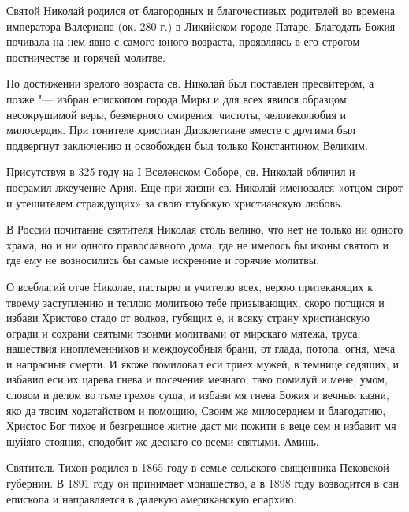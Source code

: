  

Святой Николай родился от благородных и благочестивых родителей во времена императора Валериана (ок. 280 г.) в Ликийском городе Патаре. Благодать Божия почивала на нем явно с самого юного возраста, проявляясь в его строгом постничестве и горячей молитве. 

По достижении зрелого возраста св. Николай был поставлен пресвитером, а позже "--- избран епископом города Миры и для всех явился образцом несокрушимой веры, безмерного смирения, чистоты, человеколюбия и милосердия. При гонителе христиан Диоклетиане вместе с другими был подвергнут заключению и освобожден был только Константином Великим. 

Присутствуя в 325 году на I Вселенском Соборе, св. Николай обличил и посрамил лжеучение Ария. Еще при жизни св. Николай именовался «отцом сирот и утешителем страждущих» за свою глубокую христианскую любовь. 

В России почитание святителя Николая столь велико, что нет не только ни одного храма, но и ни одного православного дома, где не имелось бы иконы святого и где ему не возносились бы самые искренние и горячие молитвы.




О всеблагий отче Николае, пастырю и учителю всех, верою притекающих к твоему заступлению и теплою молитвою тебе призывающих, скоро потщися и избави Христово стадо от волков, губящих е, и всяку страну христианскую огради и сохрани святыми твоими молитвами от мирскаго мятежа, труса, нашествия иноплеменников и междоусобныя брани, от глада, потопа, огня, меча и напрасныя смерти. И якоже помиловал еси триех мужей, в темнице седящих, и избавил еси их царева гнева и посечения мечнаго, тако помилуй и мене, умом, словом и делом во тьме грехов суща, и избави мя гнева Божия и вечныя казни, яко да твоим ходатайством и помощию, Своим же милосердием и благодатию, Христос Бог тихое и безгрешное житие даст ми пожити в веце сем и избавит мя шуйяго стояния, сподобит же деснаго со всеми святыми. Аминь.
\longpage[2]{}\mychapterending

 
Святитель Тихон родился в 1865 году в семье сельского священника Псковской губернии. В 1891 году он принимает монашество, а в 1898 году возводится в сан епископа и направляется в далекую американскую епархию. 

